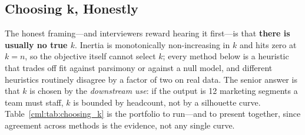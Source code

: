 \subsection{Choosing k, Honestly}
\label{cml:sec:choosing_k}

The honest framing---and interviewers reward hearing it first---is that \textbf{there is usually no true $k$}. Inertia is monotonically non-increasing in $k$ and hits zero at $k = n$, so the objective itself cannot select $k$; every method below is a heuristic that trades off fit against parsimony or against a null model, and different heuristics routinely disagree by a factor of two on real data. The senior answer is that $k$ is chosen by the \emph{downstream use}: if the output is 12 marketing segments a team must staff, $k$ is bounded by headcount, not by a silhouette curve. Table~\ref{cml:tab:choosing_k} is the portfolio to run---and to present together, since agreement across methods is the evidence, not any single curve.

